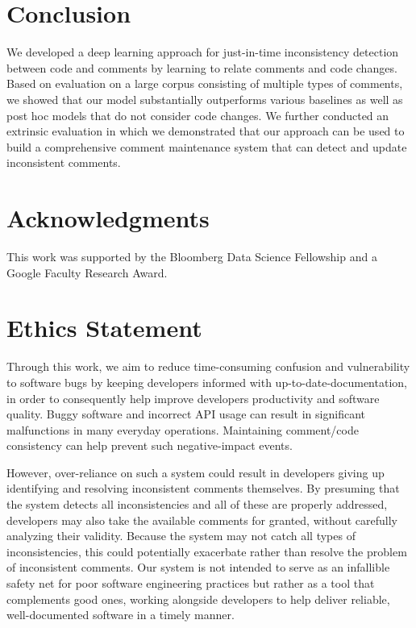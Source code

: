 \documentclass[letterpaper]{article} %
\newcommand{\Posthoc}{post hoc}
\newcommand{\JustInTime}{just-in-time}
\begin{document}
\section{Conclusion}
We developed a deep learning approach for \JustInTime{} inconsistency detection between code and comments by learning to relate comments and code changes. Based on evaluation on a large corpus consisting of multiple types of comments, we showed that our model substantially  outperforms various baselines as well as \Posthoc{} models that do not consider code changes. We further conducted an extrinsic evaluation in which we demonstrated that our approach can be used to build a comprehensive comment maintenance system that can detect and update inconsistent comments.


\section*{Acknowledgments}
This work was supported by the Bloomberg Data Science Fellowship and a Google Faculty Research Award. 


\section*{Ethics Statement}
Through this work, we aim to reduce time-consuming confusion and vulnerability to software bugs by keeping developers informed with up-to-date-documentation, in order to consequently help improve developers productivity and software quality. Buggy software and incorrect API usage can result in significant malfunctions in many everyday operations. Maintaining comment/code consistency can help prevent such negative-impact events.

However, over-reliance on such a system could result in developers giving up identifying and resolving inconsistent comments themselves. By presuming that the system detects all inconsistencies and all of these are properly addressed, developers may also take the available comments for granted, without carefully analyzing their validity. Because the system may not catch all types of inconsistencies, this could potentially exacerbate rather than resolve the problem of inconsistent comments. Our system is not intended to serve as an infallible safety net for poor software engineering practices but rather as a tool that complements good ones, working alongside developers to help deliver reliable, well-documented software in a timely manner.
\end{document}
